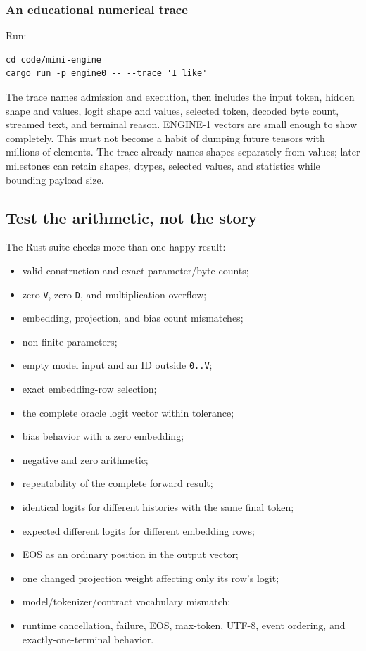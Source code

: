 \documentclass[
  10pt,
]{article}
\providecommand{\tightlist}{%
  \setlength{\itemsep}{0pt}\setlength{\parskip}{0pt}}
\begin{document}
\subsubsection{An educational numerical
trace}\label{an-educational-numerical-trace}

Run:

\begin{verbatim}
cd code/mini-engine
cargo run -p engine0 -- --trace 'I like'
\end{verbatim}

The trace names admission and execution, then includes the input token,
hidden shape and values, logit shape and values, selected token, decoded
byte count, streamed text, and terminal reason. ENGINE-1 vectors are
small enough to show completely. This must not become a habit of dumping
future tensors with millions of elements. The trace already names shapes
separately from values; later milestones can retain shapes, dtypes,
selected values, and statistics while bounding payload size.

\subsection{Test the arithmetic, not the
story}\label{test-the-arithmetic-not-the-story}

The Rust suite checks more than one happy result:

\begin{itemize}
\tightlist
\item
  valid construction and exact parameter/byte counts;
\item
  zero \texttt{V}, zero \texttt{D}, and multiplication overflow;
\item
  embedding, projection, and bias count mismatches;
\item
  non-finite parameters;
\item
  empty model input and an ID outside \texttt{0..V};
\item
  exact embedding-row selection;
\item
  the complete oracle logit vector within tolerance;
\item
  bias behavior with a zero embedding;
\item
  negative and zero arithmetic;
\item
  repeatability of the complete forward result;
\item
  identical logits for different histories with the same final token;
\item
  expected different logits for different embedding rows;
\item
  EOS as an ordinary position in the output vector;
\item
  one changed projection weight affecting only its row's logit;
\item
  model/tokenizer/contract vocabulary mismatch;
\item
  runtime cancellation, failure, EOS, max-token, UTF-8, event ordering,
  and exactly-one-terminal behavior.
\end{itemize}
\end{document}
